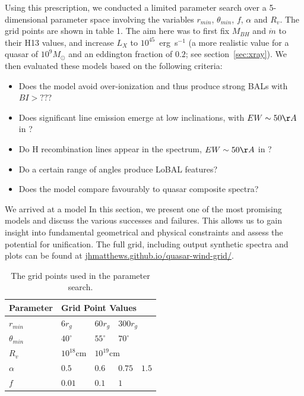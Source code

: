 \documentclass[useAMS,usenatbib]{mn2e_x}
\begin{document}
Using this prescription, we conducted a limited parameter
search over a 5-dimensional parameter space involving the 
variables $r_{min}$, $\theta_{min}$, $f$, $\alpha$ and $R_v$.
The grid points are shown in table 1.
The aim here was to first fix $M_{BH}$ and $\dot{m}$ to their H13 values,
and increase $L_X$ to $10^{45}$~erg~s$^{-1}$ (a more realistic value for a 
quasar of $10^9M_\odot$ and an eddington fraction of $0.2$; see section~\ref{sec:xray}). 
We then evaluated these models based on the following criteria:
\begin{itemize}
\item Does the model avoid over-ionization and thus produce strong BALs with $BI > ??$?
\item Does significant line emission emerge at low inclinations, with $EW\sim50\AA$ in \civ?
\item Do H recombination lines appear in the spectrum, $EW\sim50\AA$ in \la?
\item Do a certain range of angles produce LoBAL features?
\item Does the model compare favourably to quasar composite spectra?
\end{itemize}
We arrived at a model
In this section, we present one of the most promising models and discuss
the various successes and failures.
This allows us to gain insight into fundamental geometrical 
and physical constraints and assess the potential for unification. 
The full grid, including output synthetic spectra and plots can be found at
\url{jhmatthews.github.io/quasar-wind-grid/}.

\begin{table}
\begin{tabular}{p{2cm}p{1cm}p{1cm}p{1cm}p{1cm}}
Parameter & \multicolumn{4}{|l|}{Grid Point Values}  \\
\hline \hline 
$r_{min}$ 	&	 $6r_{g}$ & $60r_{g}$ & \multicolumn{2}{|l|}{$300r_{g}$} \\ 
$\theta_{min}$ 	&	 $40^{\circ}$ & $55^{\circ}$ & \multicolumn{2}{|l|}{$70^{\circ}$} \\ 
$R_v$  	        &	 $10^{18}$cm & \multicolumn{3}{|l|}{$10^{19}$cm} \\ 
$\alpha$ 	&	 $0.5$ & $0.6$ & $0.75$ & $1.5$ \\
$f$ 	&	 $0.01$ & $0.1$ & \multicolumn{2}{|l|}{$1$}  \\
\hline 
\end{tabular}
\caption{The grid points used in the parameter search.}
\label{grid_table}
\end{table}
\end{document}
